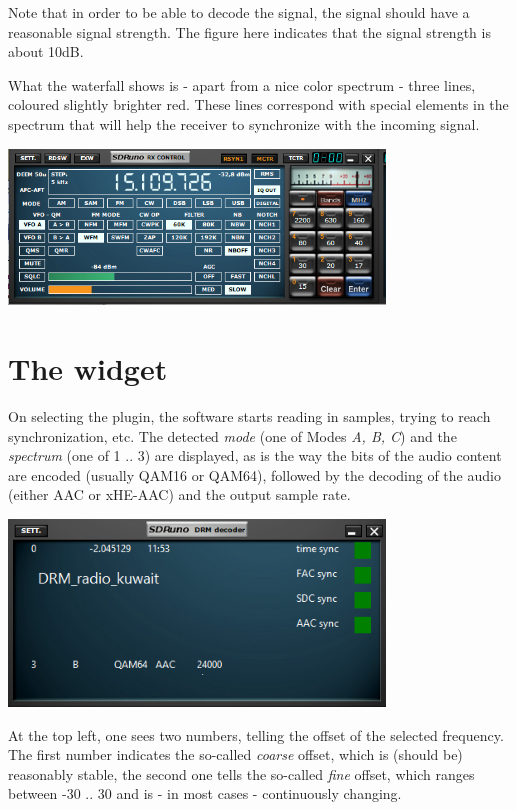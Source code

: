 \documentclass[10pt]{article}
\begin{document}
Note that in order to be able to decode the signal, the signal should
have a reasonable signal strength.  The figure here indicates that the signal strength is about 10dB.
\par
What the waterfall shows is - apart from a nice color spectrum - three
lines, coloured slightly brighter red. These lines correspond with special elements
in the spectrum that will help the receiver to synchronize with
the incoming signal.

\includegraphics[width=100mm]{drm-receiver-widget.png}

\section{The widget}
On selecting the plugin, the software starts reading in samples,
trying to reach synchronization, etc.
The detected {\em mode} (one of Modes {\em A, B, C})  and the {\em spectrum}
(one of 1 .. 3) are displayed, as is the way the bits of the
audio content are encoded (usually QAM16 or QAM64), followed by
the decoding of the audio (either AAC or xHE-AAC) and the output
sample rate.
\par

\includegraphics[width=100mm]{drm-decoder-widget-1.png}

At the top left, one sees two numbers, telling the offset of the selected
frequency. The first number indicates the so-called {\em coarse} offset,
which is (should be) reasonably stable, the second one tells the
so-called {\em fine} offset, which ranges between -30 .. 30 and is
- in most cases - continuously changing.
\end{document}
